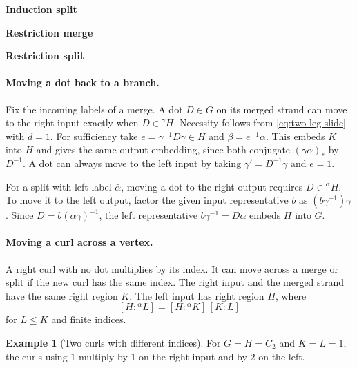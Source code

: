 \documentclass[11pt,a4paper]{article}
\numberwithin{equation}{section}
\theoremstyle{definition}
\newtheorem{example}{Example}[section]
\newcommand{\cg}[2]{{}^{#1}\!#2}
\begin{document}
\begin{center}
\begin{minipage}{.98\linewidth}
 \par\smallskip
 \textbf{Induction split}\par
\end{minipage}\par\smallskip
\begin{minipage}{.98\linewidth}
 \centering
 \textbf{Restriction merge}\par
 \par\smallskip
 \textbf{Restriction split}\par
\end{minipage}
\end{center}

\paragraph{Moving a dot back to a branch.}
Fix the incoming labels of a merge. A dot \(D\in G\) on its merged
strand can move to the right input exactly when \(D\in\cg{\gamma}{H}\).
Necessity follows from \eqref{eq:two-leg-slide} with \(d=1\).
For sufficiency take \(e=\gamma^{-1}D\gamma\in H\) and
\(\beta=e^{-1}\alpha\). This embeds \(K\) into \(H\) and gives the
same output embedding, since both conjugate \((\gamma\alpha)_*\)
by \(D^{-1}\). A dot can always move to the left input by taking
\(\gamma'=D^{-1}\gamma\) and \(e=1\).

For a split with left label \(\bar\alpha\), moving a dot to the
right output requires \(D\in\cg{\alpha}{H}\). To move it to the
left output, factor the given input representative \(b\) as
\((b\gamma^{-1})\gamma\). Since
\(D=b(\alpha\gamma)^{-1}\), the left representative
\(b\gamma^{-1}=D\alpha\) embeds \(H\) into \(G\).

\paragraph{Moving a curl across a vertex.}
A right curl with no dot multiplies by its index. It can move
across a merge or split if the new curl has the same index.
The right input and the merged strand have the same right
region \(K\). The left input has right region \(H\), where
\[
 [H:\cg{\alpha}{L}]=[H:\cg{\alpha}{K}]\,[K:L]
\]
for \(L\le K\) and finite indices.

\begin{example}[Two curls with different indices]\label{ex:different-curl-indices}
For \(G=H=C_2\) and \(K=L=1\),
the curls using \(1\) multiply by \(1\) on the right input and
by \(2\) on the left.
\end{example}
\end{document}

